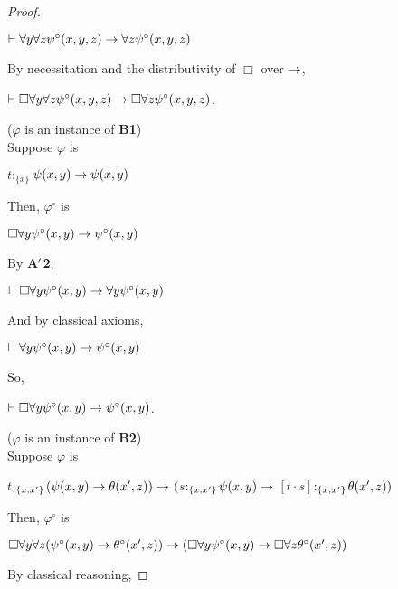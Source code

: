 \begin{proof}
\begin{center}
$\vdash \forall y\forall z \psi^{\circ}(x,y,z) \rightarrow \forall z \psi^{\circ}(x,y,z)$
\end{center}
By necessitation and the distributivity of $\Box$ over $\rightarrow$,

\begin{center}
$\vdash \Box  \forall y\forall z \psi^{\circ}(x,y,z) \rightarrow \Box  \forall z \psi^{\circ}(x,y,z)$.
\end{center}

\vspace{5mm}

($\varphi$ is an instance of \textbf{B1})\\

\qquad Suppose $\varphi$ is

\begin{center}
$t$$:_{\{x\}}$$\psi(x,y) \rightarrow \psi(x,y)$
\end{center}
Then, $\varphi^{\circ}$ is

\begin{center}
$\Box  \forall y\psi^{\circ}(x,y) \rightarrow \psi^{\circ}(x,y)$
\end{center}
By \textbf{A$^{\prime}$2},

\begin{center}
$\vdash \Box \forall y\psi^{\circ}(x,y) \rightarrow \forall y\psi^{\circ}(x,y)$
\end{center}
And by classical axioms,

\begin{center}
$\vdash \forall y\psi^{\circ}(x,y) \rightarrow \psi^{\circ}(x,y)$
\end{center}
So, 

\begin{center}
$\vdash \Box  \forall y\psi^{\circ}(x,y) \rightarrow \psi^{\circ}(x,y)$.
\end{center}
\vspace{5mm}

($\varphi$ is an instance of \textbf{B2})\\

Suppose $\varphi$ is

\begin{center}
$t$$:_{\{x,x^{\prime}\}}$$(\psi(x,y) \rightarrow \theta(x^{\prime},z)) \rightarrow$ $(s$$:_{\{x,x^{\prime}\}}$$\psi(x,y) \rightarrow$ $[t\cdot s]$$:_{\{x,x^{\prime}\}}$$\theta(x^{\prime},z))$
\end{center}
Then, $\varphi^{\circ}$ is

\begin{center}
$\Box  \forall y\forall z (\psi^{\circ}(x,y) \rightarrow \theta^{\circ}(x^{\prime},z)) \rightarrow (\Box \forall y \psi^{\circ}(x,y) \rightarrow \Box \forall z \theta^{\circ}(x^{\prime},z))$
\end{center}
By classical reasoning,



\end{proof}
